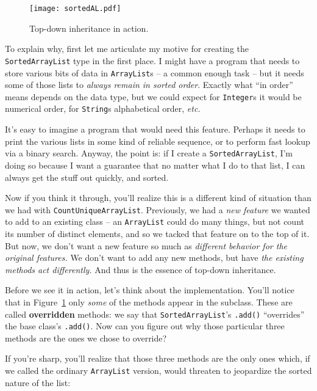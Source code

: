 \begin{figure}
\centering
\texttt{[image: sortedAL.pdf]}
\caption{Top-down inheritance in action.}
\label{fig:sortedAL}
\end{figure}

To explain why, first let me articulate my motive for creating the
\texttt{SortedArrayList} type in the first place. I might have a program that
needs to store various bits of data in \texttt{ArrayList}s -- a common enough
task -- but it needs some of those lists to \textit{always remain in sorted
order}. Exactly what ``in order'' means depends on the data type, but we could
expect for \texttt{Integer}s it would be numerical order, for \texttt{String}s
alphabetical order, \textit{etc.}

It's easy to imagine a program that would need this feature. Perhaps it needs
to print the various lists in some kind of reliable sequence, or to perform
fast lookup via a binary search. Anyway, the point is: if I create a
\texttt{SortedArrayList}, I'm doing so because I want a guarantee that no
matter what I do to that list, I can always get the stuff out quickly, and
sorted.

Now if you think it through, you'll realize this is a different kind of
situation than we had with \texttt{CountUniqueArrayList}. Previously, we had a
\textit{new feature} we wanted to add to an existing class -- an
\texttt{ArrayList} could do many things, but not count its number of distinct
elements, and so we tacked that feature on to the top of it. But now, we don't
want a new feature so much as \textit{different behavior for the original
features.} We don't want to add any new methods, but have \textit{the existing
methods act differently.} And thus is the essence of top-down inheritance.

Before we see it in action, let's think about the implementation. You'll
notice that in Figure~\ref{fig:sortedAL} only \textit{some} of the methods
appear in the subclass. These are called \textbf{overridden} methods: we say
that \texttt{SortedArrayList}'s \texttt{.add()} ``overrides'' the base class's
\texttt{.add()}. Now can you figure out why those particular three methods are
the ones we chose to override?

If you're sharp, you'll realize that those three methods are the only ones
which, if we called the ordinary \texttt{ArrayList} version, would threaten to
jeopardize the sorted nature of the list:

